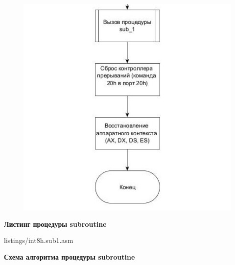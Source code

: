 \begin{figure}[!ht]
    \begin{center}
        \includegraphics[width=12cm]{img/int8h.2.2}
    \end{center}
\end{figure}

\clearpage
\newpage

\begin{center}
{\bf\normalsize Листинг процедуры subroutine}
\end{center}

\begin{lstinputlisting}[style={asm},linerange={1-95}]{listings/int8h.sub1.asm}
\end{lstinputlisting}

\newpage
\begin{center}
{\bf\normalsize Схема алгоритма процедуры subroutine}
\end{center}

